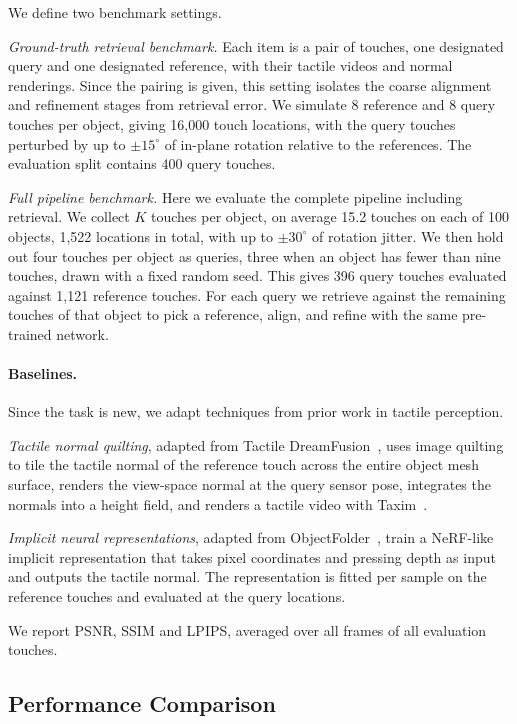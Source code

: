We define two benchmark settings.

\emph{Ground-truth retrieval benchmark.} Each item is a pair of touches, one designated query and
one designated reference, with their tactile videos and normal renderings. Since the pairing
is given, this setting isolates the coarse alignment and refinement stages from retrieval error.
We simulate 8 reference and 8 query touches per object, giving 16{,}000 touch locations, with the
query touches perturbed by up to $\pm15^\circ$ of in-plane rotation relative to the references.
The evaluation split contains 400 query touches.

\emph{Full pipeline benchmark.} Here we evaluate the complete pipeline including retrieval. We
collect $K$ touches per object, on average 15.2 touches on each of 100 objects, 1{,}522
locations in total, with up to $\pm30^\circ$ of rotation jitter. We then hold out four touches per
object as queries, three when an object has fewer than nine touches, drawn with a fixed random
seed. This gives 396 query touches evaluated against 1{,}121 reference touches. For each query we
retrieve against the remaining touches of that object to pick a reference, align, and refine with
the same pre-trained network.

\paragraph{Baselines.}
Since the task is new, we adapt techniques from prior work in tactile perception.

\emph{Tactile normal quilting}, adapted from Tactile DreamFusion~\cite{tactiledreamfusion}, uses
image quilting to tile the tactile normal of the reference touch across the entire object mesh
surface, renders the view-space normal at the query sensor pose, integrates the normals into a
height field, and renders a tactile video with Taxim~\cite{taxim}.

\emph{Implicit neural representations}, adapted from ObjectFolder~\cite{objectfolder}, train a
NeRF-like implicit representation that takes pixel coordinates and pressing depth as input and
outputs the tactile normal. The representation is fitted per sample on the reference touches and
evaluated at the query locations.

We report PSNR, SSIM and LPIPS, averaged over all frames of all evaluation touches.

\subsection{Performance Comparison}

